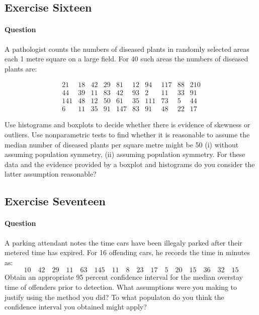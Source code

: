 \documentclass[]{article}
\let\oldparagraph\paragraph
\renewcommand{\paragraph}[1]{\oldparagraph{#1}\mbox{}}
\begin{document}
\subsection{Exercise Sixteen}\label{exercise-sixteen}

\paragraph{Question}\label{question-15}

A pathologist counts the numbers of diseased plants in randomly selected
areas each 1 metre square on a large field. For 40 such areas the
numbers of diseased plants are:

\[\begin{array}
{cccccccccc}
21 & 18 & 42 & 29 & 81 & 12 & 94 & 117 & 88 & 210 \\
44 & 39 & 11 & 83 & 42 & 93 & 2 & 11 & 33 & 91 \\
141 & 48 & 12 & 50 & 61 & 35 & 111 & 73 & 5 & 44\\
6 & 11 & 35 & 91 & 147 & 83 & 91 & 48 & 22 & 17
\end{array}
\]

Use histograms and boxplots to decide whether there is evidence of
skewness or outliers. Use nonparametric tests to find whether it is
reasonable to assume the median number of diseased plants per square
metre might be 50 (i) without assuming population symmetry, (ii)
assuming population symmetry. For these data and the evidence provided
by a boxplot and histograms do you consider the latter assumption
reasonable?

\subsection{Exercise Seventeen}\label{exercise-seventeen}

\paragraph{Question}\label{question-16}

A parking attendant notes the time cars have been illegaly parked after
their metered time has expired. For 16 offending cars, he records the
time in minutes as:
\[ 10\quad42\quad29\quad11\quad63\quad145\quad11\quad8\quad23\quad17\quad5\quad20\quad15\quad36\quad32\quad15 \]
Obtain an appropriate 95 percent confidence interval for the median
overstay time of offenders prior to detection. What assumptions were you
making to justify using the method you did? To what populaton do you
think the confidence interval you obtained might apply?
\end{document}
